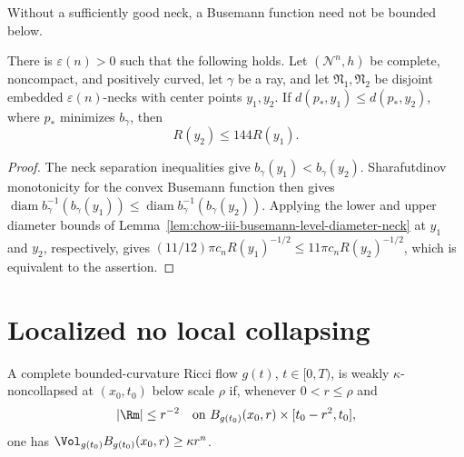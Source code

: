 \begin{remark}
\label{rem:chow-iii-busemann-minimum-neck-essential}
Without a sufficiently good neck, a Busemann function need not be bounded
below.
\end{remark}

\begin{proposition}
\label{prop:chow-iii-farther-necks-larger-radii}
There is \(\varepsilon(n)>0\) such that the following holds.  Let
\((\mathcal N^n,h)\) be complete, noncompact, and positively curved, let
\(\gamma\) be a ray, and let \(\mathfrak N_1,\mathfrak N_2\) be disjoint
embedded \(\varepsilon(n)\)-necks with center points \(y_1,y_2\).  If
\(d(p_*,y_1)\le d(p_*,y_2)\), where \(p_*\) minimizes \(b_\gamma\), then
\[
 R(y_2)\le144R(y_1).
\]
\end{proposition}
\begin{proof}
\sketch The neck separation inequalities give \(b_\gamma(y_1)<b_\gamma(y_2)\).
Sharafutdinov monotonicity for the convex Busemann function then gives
\(\operatorname{diam}b_\gamma^{-1}(b_\gamma(y_1))\le
\operatorname{diam}b_\gamma^{-1}(b_\gamma(y_2))\).  Applying the lower and
upper diameter bounds of Lemma~\ref{lem:chow-iii-busemann-level-diameter-neck}
at \(y_1\) and \(y_2\), respectively, gives
\((11/12)\pi c_nR(y_1)^{-1/2}\le11\pi c_nR(y_2)^{-1/2}\), which is equivalent
to the assertion.
\end{proof}

\section{Localized no local collapsing}

\begin{definition}
\label{def:chow-iii-weakly-kappa-noncollapsed}
A complete bounded-curvature Ricci flow \(g(t)\), \(t\in[0,T)\), is weakly
\(\kappa\)-noncollapsed at \((x_0,t_0)\) below scale \(\rho\) if, whenever
\(0<r\le\rho\) and
\[
 |\Rm|\le r^{-2}\quad\text{on }B_{g(t_0)}(x_0,r)\times[t_0-r^2,t_0],
\]
one has \(\Vol_{g(t_0)}B_{g(t_0)}(x_0,r)\ge\kappa r^n\).
\end{definition}

